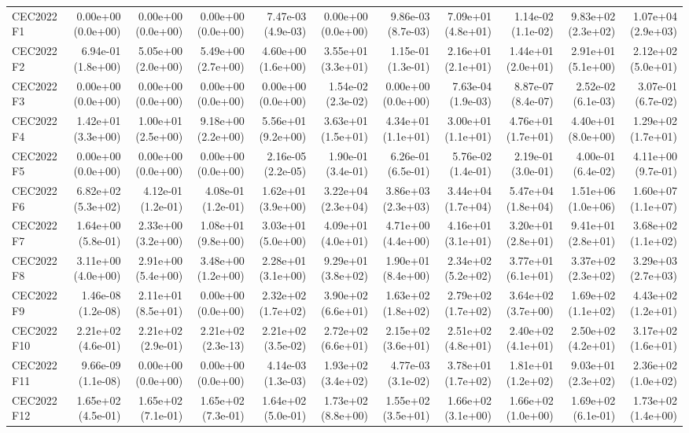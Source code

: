 \begin{longtable}{lrrrrrrrrrr}
CEC2022 F1 & 0.00e+00 (0.0e+00) & 0.00e+00 (0.0e+00) & 0.00e+00 (0.0e+00) & 7.47e-03 (4.9e-03) & 0.00e+00 (0.0e+00) & 9.86e-03 (8.7e-03) & 7.09e+01 (4.8e+01) & 1.14e-02 (1.1e-02) & 9.83e+02 (2.3e+02) & 1.07e+04 (2.9e+03) \\
CEC2022 F2 & 6.94e-01 (1.8e+00) & 5.05e+00 (2.0e+00) & 5.49e+00 (2.7e+00) & 4.60e+00 (1.6e+00) & 3.55e+01 (3.3e+01) & 1.15e-01 (1.3e-01) & 2.16e+01 (2.1e+01) & 1.44e+01 (2.0e+01) & 2.91e+01 (5.1e+00) & 2.12e+02 (5.0e+01) \\
CEC2022 F3 & 0.00e+00 (0.0e+00) & 0.00e+00 (0.0e+00) & 0.00e+00 (0.0e+00) & 0.00e+00 (0.0e+00) & 1.54e-02 (2.3e-02) & 0.00e+00 (0.0e+00) & 7.63e-04 (1.9e-03) & 8.87e-07 (8.4e-07) & 2.52e-02 (6.1e-03) & 3.07e-01 (6.7e-02) \\
CEC2022 F4 & 1.42e+01 (3.3e+00) & 1.00e+01 (2.5e+00) & 9.18e+00 (2.2e+00) & 5.56e+01 (9.2e+00) & 3.63e+01 (1.5e+01) & 4.34e+01 (1.1e+01) & 3.00e+01 (1.1e+01) & 4.76e+01 (1.7e+01) & 4.40e+01 (8.0e+00) & 1.29e+02 (1.7e+01) \\
CEC2022 F5 & 0.00e+00 (0.0e+00) & 0.00e+00 (0.0e+00) & 0.00e+00 (0.0e+00) & 2.16e-05 (2.2e-05) & 1.90e-01 (3.4e-01) & 6.26e-01 (6.5e-01) & 5.76e-02 (1.4e-01) & 2.19e-01 (3.0e-01) & 4.00e-01 (6.4e-02) & 4.11e+00 (9.7e-01) \\
CEC2022 F6 & 6.82e+02 (5.3e+02) & 4.12e-01 (1.2e-01) & 4.08e-01 (1.2e-01) & 1.62e+01 (3.9e+00) & 3.22e+04 (2.3e+04) & 3.86e+03 (2.3e+03) & 3.44e+04 (1.7e+04) & 5.47e+04 (1.8e+04) & 1.51e+06 (1.0e+06) & 1.60e+07 (1.1e+07) \\
CEC2022 F7 & 1.64e+00 (5.8e-01) & 2.33e+00 (3.2e+00) & 1.08e+01 (9.8e+00) & 3.03e+01 (5.0e+00) & 4.09e+01 (4.0e+01) & 4.71e+00 (4.4e+00) & 4.16e+01 (3.1e+01) & 3.20e+01 (2.8e+01) & 9.41e+01 (2.8e+01) & 3.68e+02 (1.1e+02) \\
CEC2022 F8 & 3.11e+00 (4.0e+00) & 2.91e+00 (5.4e+00) & 3.48e+00 (1.2e+00) & 2.28e+01 (3.1e+00) & 9.29e+01 (3.8e+02) & 1.90e+01 (8.4e+00) & 2.34e+02 (5.2e+02) & 3.77e+01 (6.1e+01) & 3.37e+02 (2.3e+02) & 3.29e+03 (2.7e+03) \\
CEC2022 F9 & 1.46e-08 (1.2e-08) & 2.11e+01 (8.5e+01) & 0.00e+00 (0.0e+00) & 2.32e+02 (1.7e+02) & 3.90e+02 (6.6e+01) & 1.63e+02 (1.8e+02) & 2.79e+02 (1.7e+02) & 3.64e+02 (3.7e+00) & 1.69e+02 (1.1e+02) & 4.43e+02 (1.2e+01) \\
CEC2022 F10 & 2.21e+02 (4.6e-01) & 2.21e+02 (2.9e-01) & 2.21e+02 (2.3e-13) & 2.21e+02 (3.5e-02) & 2.72e+02 (6.6e+01) & 2.15e+02 (3.6e+01) & 2.51e+02 (4.8e+01) & 2.40e+02 (4.1e+01) & 2.50e+02 (4.2e+01) & 3.17e+02 (1.6e+01) \\
CEC2022 F11 & 9.66e-09 (1.1e-08) & 0.00e+00 (0.0e+00) & 0.00e+00 (0.0e+00) & 4.14e-03 (1.3e-03) & 1.93e+02 (3.4e+02) & 4.77e-03 (3.1e-02) & 3.78e+01 (1.7e+02) & 1.81e+01 (1.2e+02) & 9.03e+01 (2.3e+02) & 2.36e+02 (1.0e+02) \\
CEC2022 F12 & 1.65e+02 (4.5e-01) & 1.65e+02 (7.1e-01) & 1.65e+02 (7.3e-01) & 1.64e+02 (5.0e-01) & 1.73e+02 (8.8e+00) & 1.55e+02 (3.5e+01) & 1.66e+02 (3.1e+00) & 1.66e+02 (1.0e+00) & 1.69e+02 (6.1e-01) & 1.73e+02 (1.4e+00) \\
\bottomrule
\end{longtable}
